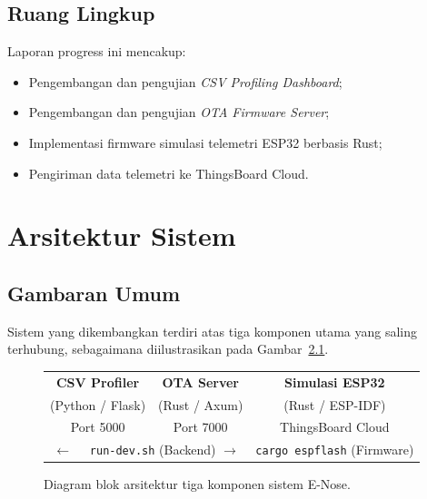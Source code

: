 \documentclass[12pt,a4paper]{report}
\begin{document}
\section{Ruang Lingkup}

Laporan progress ini mencakup:
\begin{itemize}[leftmargin=2cm, itemsep=2pt]
  \item Pengembangan dan pengujian \textit{CSV Profiling Dashboard};
  \item Pengembangan dan pengujian \textit{OTA Firmware Server};
  \item Implementasi firmware simulasi telemetri ESP32 berbasis Rust;
  \item Pengiriman data telemetri ke ThingsBoard Cloud.
\end{itemize}

\chapter{Arsitektur Sistem}

\section{Gambaran Umum}

Sistem yang dikembangkan terdiri atas tiga komponen utama yang saling terhubung,
sebagaimana diilustrasikan pada Gambar~\ref{fig:arsitektur}.

\begin{figure}[H]
  \centering
  \begin{tcolorbox}[
    colback=noteboxbg,
    colframe=noteboxborder,
    boxrule=0.8pt,
    arc=4pt,
    width=0.95\textwidth
  ]
  \centering
  \vspace{0.3cm}
  \begin{tabular}{ccc}
    \textbf{\color{darkblue}CSV Profiler} &
    \textbf{\color{darkblue}OTA Server} &
    \textbf{\color{darkblue}Simulasi ESP32} \\[4pt]
    \small(Python / Flask) &
    \small(Rust / Axum) &
    \small(Rust / ESP-IDF) \\[4pt]
    \small Port 5000 &
    \small Port 7000 &
    \small ThingsBoard Cloud \\[8pt]
    \multicolumn{2}{c}{$\longleftarrow\quad$ \texttt{run-dev.sh} (Backend) \quad$\longrightarrow$} &
    \small \texttt{cargo espflash} (Firmware)
  \end{tabular}
  \vspace{0.3cm}
  \end{tcolorbox}
  \caption{Diagram blok arsitektur tiga komponen sistem E-Nose.}
  \label{fig:arsitektur}
\end{figure}
\end{document}

